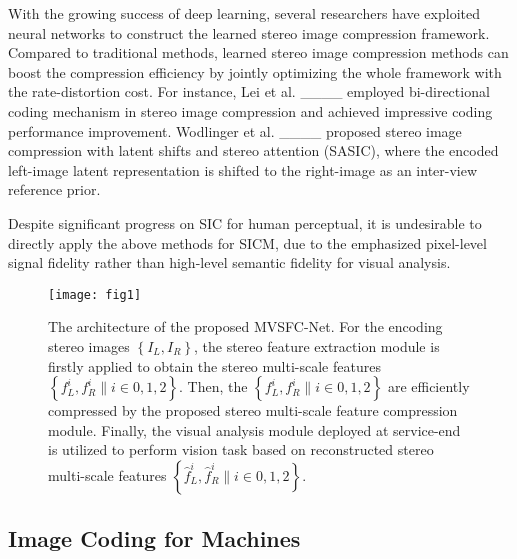 With the growing success of deep learning, several researchers have exploited neural networks to construct the learned stereo image compression framework. Compared to traditional methods, learned stereo image compression methods can boost the compression efficiency \textcolor[rgb]{0,0,0}{by jointly optimizing the whole framework with the rate-distortion cost}. For instance,  Lei et al. ____ employed bi-directional coding mechanism in stereo image compression and achieved impressive coding performance improvement. Wodlinger et al.  ____ proposed stereo image compression with latent shifts and stereo attention (SASIC), where the encoded left-image latent representation is shifted to the \textcolor[rgb]{0,0,0}{right-image as an inter-view reference prior}.

Despite significant progress on SIC for human perceptual, it is undesirable to directly apply the above methods for SICM, due to the emphasized pixel-level signal fidelity rather than high-level semantic fidelity for visual analysis.

\begin{figure*}[htbp]
	\centering
	\texttt{[image: fig1]}
	\caption{\textcolor[rgb]{0,0,0}{The architecture of the proposed MVSFC-Net. For the encoding stereo images $ \left\{I_{L}, I_{R}\right\} $, the stereo feature extraction module is firstly applied to obtain the stereo multi-scale features $ \left\{f_{L}^{i}, f_{R}^{i}\|i\in 0,1,2\right\} $. Then, the $ \left\{f_{L}^{i}, f_{R}^{i}\|i\in 0,1,2\right\} $ are efficiently compressed by the proposed stereo multi-scale feature compression module. Finally, the visual analysis module deployed at service-end is utilized to perform vision task based on reconstructed stereo multi-scale features $ \left\{\hat{f}_{L}^{i}, \hat{f}_{R}^{i}\|i\in 0,1,2\right\} $}.}
	
	\label{fig1}
\end{figure*}

\subsection{Image Coding for Machines}


